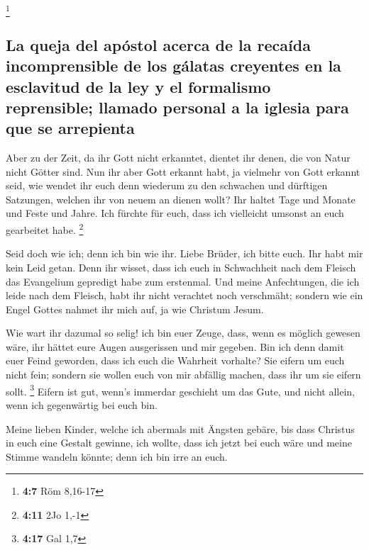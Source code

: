 \footnote{\textbf{4:7} Röm 8,16-17}

\hypertarget{la-queja-del-apuxf3stol-acerca-de-la-recauxedda-incomprensible-de-los-guxe1latas-creyentes-en-la-esclavitud-de-la-ley-y-el-formalismo-reprensible-llamado-personal-a-la-iglesia-para-que-se-arrepienta}{%
\subsection{La queja del apóstol acerca de la recaída incomprensible de
los gálatas creyentes en la esclavitud de la ley y el formalismo
reprensible; llamado personal a la iglesia para que se
arrepienta}\label{la-queja-del-apuxf3stol-acerca-de-la-recauxedda-incomprensible-de-los-guxe1latas-creyentes-en-la-esclavitud-de-la-ley-y-el-formalismo-reprensible-llamado-personal-a-la-iglesia-para-que-se-arrepienta}}

 Aber zu der Zeit, da ihr Gott nicht erkanntet, dientet
ihr denen, die von Natur nicht Götter sind.  Nun ihr aber
Gott erkannt habt, ja vielmehr von Gott erkannt seid, wie wendet ihr
euch denn wiederum zu den schwachen und dürftigen Satzungen, welchen ihr
von neuem an dienen wollt?  Ihr haltet Tage und Monate
und Feste und Jahre.  Ich fürchte für euch, dass ich
vielleicht umsonst an euch gearbeitet habe. \footnote{\textbf{4:11} 2Jo
  1,-1}

 Seid doch wie ich; denn ich bin wie ihr. Liebe Brüder,
ich bitte euch. Ihr habt mir kein Leid getan.  Denn ihr
wisset, dass ich euch in Schwachheit nach dem Fleisch das Evangelium
gepredigt habe zum erstenmal.  Und meine Anfechtungen,
die ich leide nach dem Fleisch, habt ihr nicht verachtet noch
verschmäht; sondern wie ein Engel Gottes nahmet ihr mich auf, ja wie
Christum Jesum.

 Wie wart ihr dazumal so selig! ich bin euer Zeuge, dass,
wenn es möglich gewesen wäre, ihr hättet eure Augen ausgerissen und mir
gegeben.  Bin ich denn damit euer Feind geworden, dass
ich euch die Wahrheit vorhalte?  Sie eifern um euch nicht
fein; sondern sie wollen euch von mir abfällig machen, dass ihr um sie
eifern sollt. \footnote{\textbf{4:17} Gal 1,7}  Eifern
ist gut, wenn's immerdar geschieht um das Gute, und nicht allein, wenn
ich gegenwärtig bei euch bin.

 Meine lieben Kinder, welche ich abermals mit Ängsten
gebäre, bis dass Christus in euch eine Gestalt gewinne, 
ich wollte, dass ich jetzt bei euch wäre und meine Stimme wandeln
könnte; denn ich bin irre an euch.

